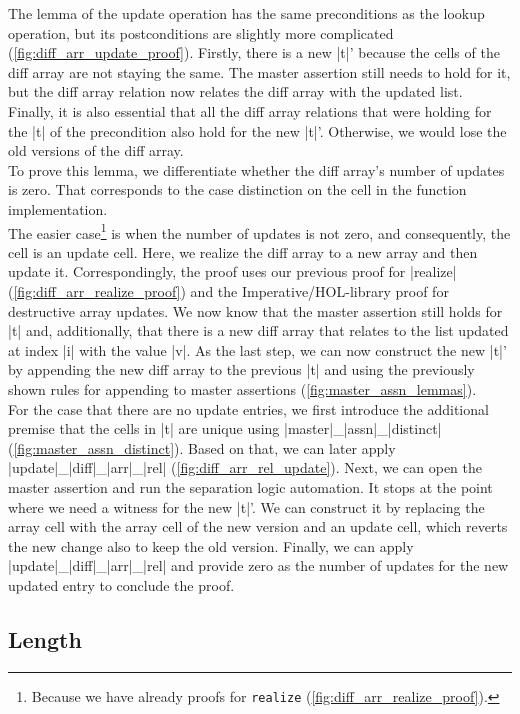 \noindent The lemma of the update operation has the same preconditions as the lookup operation, but its postconditions are slightly more complicated (\autoref{fig:diff_arr_update_proof}). Firstly, there is a new |t|' because the cells of the diff array are not staying the same. The master assertion still needs to hold for it, but the diff array relation now relates the diff array with the updated list. Finally, it is also essential that all the diff array relations that were holding for the |t| of the precondition also hold for the new |t|'. Otherwise, we would lose the old versions of the diff array.\\
To prove this lemma, we differentiate whether the diff array's number of updates is zero. That corresponds to the case distinction on the cell in the function implementation.\\
The easier case\footnote{Because we have already proofs for \lstinline!realize! (\autoref{fig:diff_arr_realize_proof}).} is when the number of updates is not zero, and consequently, the cell is an update cell. Here, we realize the diff array to a new array and then update it. Correspondingly, the proof uses our previous proof for |realize| (\autoref{fig:diff_arr_realize_proof}) and the Imperative/HOL-library proof for destructive array updates. We now know that the master assertion still holds for |t| and, additionally, that there is a new diff array that relates to the list updated at index |i| with the value |v|. As the last step, we can now construct the new |t|' by appending the new diff array to the previous |t| and using the previously shown rules for appending to master assertions (\autoref{fig:master_assn_lemmas}).\\
For the case that there are no update entries, we first introduce the additional premise that the cells in |t| are unique using |master|\_|assn|\_|distinct| (\autoref{fig:master_assn_distinct}). Based on that, we can later apply |update|\_|diff|\_|arr|\_|rel| (\autoref{fig:diff_arr_rel_update}). Next, we can open the master assertion and run the separation logic automation. It stops at the point where we need a witness for the new |t|'. We can construct it by replacing the array cell with the array cell of the new version and an update cell, which reverts the new change also to keep the old version. Finally, we can apply |update|\_|diff|\_|arr|\_|rel| and provide zero as the number of updates for the new updated entry to conclude the proof.

\subsection{Length}

